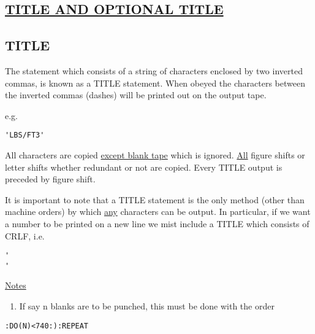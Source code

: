 \documentclass[10pt, a4paper, oneside]{article}
\newcommand{\myuline}[1]{\uline{#1}}
\begin{document}
\begin{multicols}{2}
\section{\myuline{TITLE AND OPTIONAL TITLE}}

\subsection{TITLE}

The statement which consists of a string of
characters enclosed by two inverted commas, is known
as a TITLE statement.  When obeyed the characters
between the inverted commas (dashes) will be printed
out on the output tape.

\begin{flushleft}
e.g.
\end{flushleft}

\begin{addmargin}[1cm]{1em}%
\begin{lstlisting}
'LBS/FT3'
\end{lstlisting}
\end{addmargin}

All characters are copied \myuline{except blank tape} which
is ignored.  \myuline{All} figure shifts or letter shifts whether
redundant or not are copied.  Every TITLE output is
preceded by figure shift.

It is important to note that a TITLE statement
is the only method (other than machine orders) by
which \myuline{any} characters can be output.  In particular, if
we want a number to be printed on a new line we mist
include a TITLE which consists of CRLF, i.e.

\begin{addmargin}[1cm]{1em}%
\begin{lstlisting}
'
'
\end{lstlisting}
\end{addmargin}

\begin{flushleft}
\myuline{Notes}
\end{flushleft}

\renewcommand{\labelenumi}{(\theenumi)}
\begin{enumerate}

\item If say n blanks are to be punched, this must be
done with the order
\end{enumerate}

\begin{addmargin}[1cm]{1em}%
\begin{lstlisting}
:DO(N)<740:):REPEAT
\end{lstlisting}
\end{addmargin}


\end{multicols}
\end{document}
